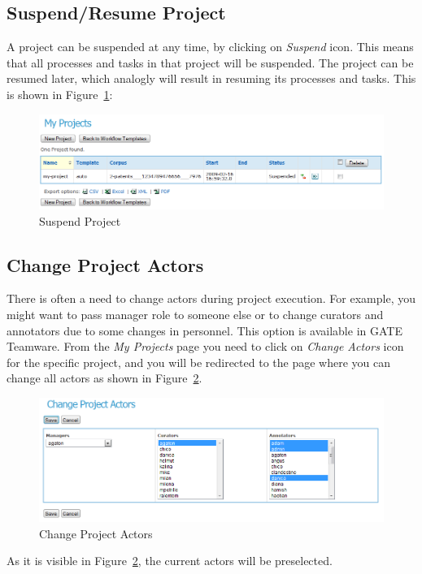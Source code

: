 \subsection{Suspend/Resume Project}
 A project can be suspended at any time, by clicking on \emph{Suspend} icon.
This means that all processes and tasks in that project will be suspended.
The project can be resumed later, which analogly will result in resuming
its processes and tasks.
This is shown in Figure~\ref{fig:suspendproject}:
\begin{figure}[htb]
\centering
\includegraphics[scale=0.4]{suspendproject}
\caption{Suspend Project}
\label{fig:suspendproject}
\end{figure}

\subsection{Change Project Actors}
There is often a need to change actors during project execution.
For example, you might want to pass manager role to someone else or to change
curators and annotators due to some changes in personnel. This option is
available in GATE Teamware.
From the \emph{My Projects} page you need to click on \emph{Change Actors} icon
for the specific project, and you will be redirected to the page where you can
change all actors as shown in Figure~\ref{fig:changeprojectactors}.
\begin{figure}[htb]
\centering
\includegraphics[scale=0.4]{changeprojectactors}
\caption{Change Project Actors}
\label{fig:changeprojectactors}
\end{figure}
As it is visible in Figure~\ref{fig:changeprojectactors}, the current
actors will be preselected.

